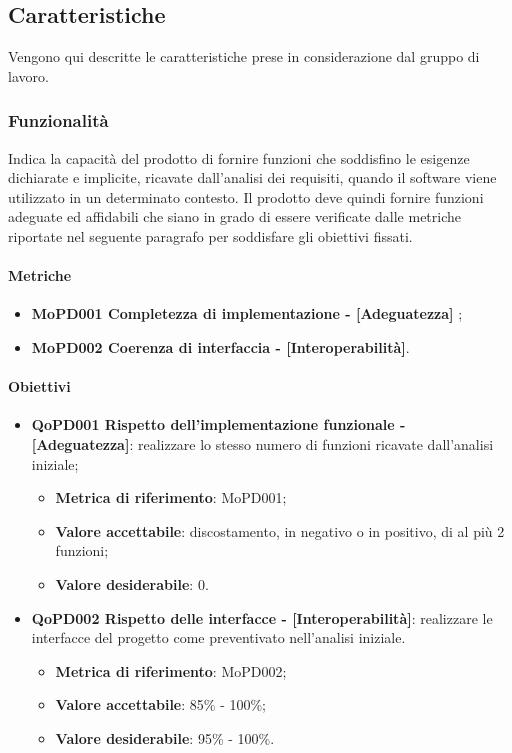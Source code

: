 \documentclass[../piano-di-qualifica.tex]{subfiles}
\begin{document}
\subsection{Caratteristiche}%
\label{sub:caratteristiche}
Vengono qui descritte le caratteristiche prese in considerazione dal gruppo di lavoro.

\subsubsection{Funzionalità}%
\label{sub:funzionalita}
Indica la capacità del prodotto di fornire funzioni che soddisfino le esigenze dichiarate e implicite, ricavate dall'analisi dei requisiti, quando il software viene utilizzato in un determinato contesto.
Il prodotto deve quindi fornire funzioni adeguate ed affidabili che siano in grado di essere verificate dalle metriche riportate nel seguente paragrafo per soddisfare gli obiettivi fissati.

\paragraph{Metriche}
\label{sub:metriche}
\begin{itemize}
    \item \textbf{MoPD001 Completezza di implementazione - [Adeguatezza]} ;
    \item \textbf{MoPD002 Coerenza di interfaccia - [Interoperabilità]}.
\end{itemize}

\paragraph{Obiettivi}
\label{sub:obiettivi}
\begin{itemize}
    \item \textbf{QoPD001 Rispetto dell'implementazione funzionale - [Adeguatezza]}: realizzare lo stesso numero di funzioni ricavate dall'analisi iniziale;
        \begin{itemize}
            \item \textbf{Metrica di riferimento}: MoPD001;
            \item \textbf{Valore accettabile}: discostamento, in negativo o in positivo, di al più 2 funzioni;
            \item \textbf{Valore desiderabile}: 0.
        \end{itemize}
    \item \textbf{QoPD002 Rispetto delle interfacce - [Interoperabilità]}: realizzare le interfacce del progetto come preventivato nell'analisi iniziale.
        \begin{itemize}
            \item \textbf{Metrica di riferimento}: MoPD002;
            \item \textbf{Valore accettabile}: 85\% - 100\%;
            \item \textbf{Valore desiderabile}: 95\% - 100\%.
        \end{itemize}
\end{itemize}
\end{document}
